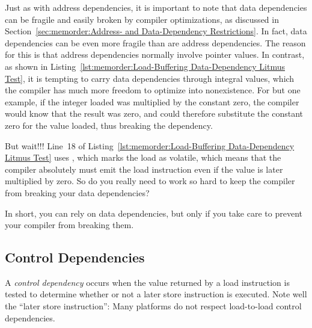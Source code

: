 Just as with address dependencies, it is important to note that
data dependencies can
be fragile and easily broken by compiler optimizations, as discussed in
Section~\ref{sec:memorder:Address- and Data-Dependency Restrictions}.
In fact, data dependencies can be even more fragile than are address
dependencies.
The reason for this is that address dependencies normally involve
pointer values.
In contrast, as shown in
Listing~\ref{lst:memorder:Load-Buffering Data-Dependency Litmus Test},
it is tempting to carry data dependencies through integral values,
which the compiler has much more freedom to optimize into nonexistence.
For but one example, if the integer loaded was multiplied by the constant
zero, the compiler would know that the result was zero, and could therefore
substitute the constant zero for the value loaded, thus breaking
the dependency.

\QuickQuiz{}
	But wait!!!
	Line~18 of
	Listing~\ref{lst:memorder:Load-Buffering Data-Dependency Litmus Test}
	uses , which marks the load as volatile,
	which means that the compiler absolutely must emit the load
	instruction even if the value is later multiplied by zero.
	So do you really need to work so hard to keep the compiler from
	breaking your data dependencies?
 \QuickQuizEnd

In short, you can rely on data dependencies, but only if you take care
to prevent your compiler from breaking them.

\subsection{Control Dependencies}
\label{sec:memorder:Control Dependencies}

A \emph{control dependency} occurs when the value returned by a load
instruction is tested to determine whether or not a later store instruction
is executed.
Note well the ``later store instruction'': Many platforms do not respect
load-to-load control dependencies.

